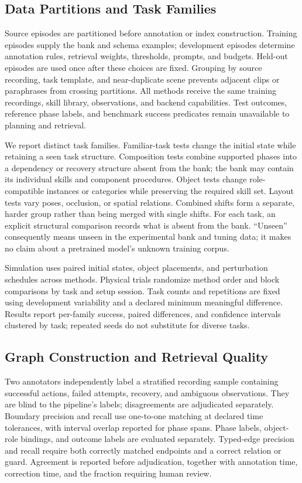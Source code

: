 \subsection{Data Partitions and Task Families}

Source episodes are partitioned before annotation or index construction. Training episodes supply the bank and schema examples; development episodes determine annotation rules, retrieval weights, thresholds, prompts, and budgets. Held-out episodes are used once after these choices are fixed. Grouping by source recording, task template, and near-duplicate scene prevents adjacent clips or paraphrases from crossing partitions. All methods receive the same training recordings, skill library, observations, and backend capabilities. Test outcomes, reference phase labels, and benchmark success predicates remain unavailable to planning and retrieval.

We report distinct task families. Familiar-task tests change the initial state while retaining a seen task structure. Composition tests combine supported phases into a dependency or recovery structure absent from the bank; the bank may contain its individual skills and component procedures. Object tests change role-compatible instances or categories while preserving the required skill set. Layout tests vary poses, occlusion, or spatial relations. Combined shifts form a separate, harder group rather than being merged with single shifts. For each task, an explicit structural comparison records what is absent from the bank. ``Unseen'' consequently means unseen in the experimental bank and tuning data; it makes no claim about a pretrained model's unknown training corpus.

Simulation uses paired initial states, object placements, and perturbation schedules across methods. Physical trials randomize method order and block comparisons by task and setup session. Task counts and repetitions are fixed using development variability and a declared minimum meaningful difference. Results report per-family success, paired differences, and confidence intervals clustered by task; repeated seeds do not substitute for diverse tasks.

\subsection{Graph Construction and Retrieval Quality}

Two annotators independently label a stratified recording sample containing successful actions, failed attempts, recovery, and ambiguous observations. They are blind to the pipeline's labels; disagreements are adjudicated separately. Boundary precision and recall use one-to-one matching at declared time tolerances, with interval overlap reported for phase spans. Phase labels, object-role bindings, and outcome labels are evaluated separately. Typed-edge precision and recall require both correctly matched endpoints and a correct relation or guard. Agreement is reported before adjudication, together with annotation time, correction time, and the fraction requiring human review.


